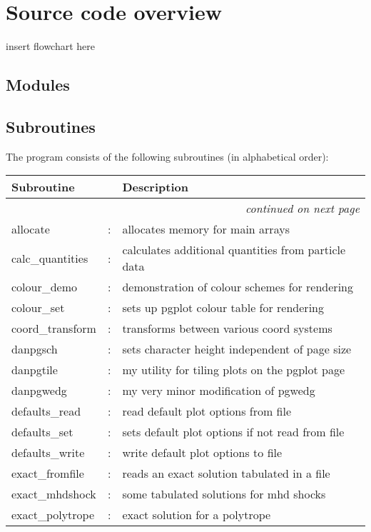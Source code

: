 \documentclass[a4paper,12pt]{article}
\begin{document}
\newpage
\appendix


\section{Source code overview}
 insert flowchart here

\subsection{Modules}

\subsection{Subroutines}
The program consists of the following subroutines (in alphabetical order):
\begin{longtable}{|lcp{}|}
\hline
Subroutine &  & Description \\
\hline \endhead
\multicolumn{3}{|r|}{\emph{continued on next page}} \\
\hline \endfoot
\hline \endlastfoot
allocate           & : & allocates memory for main arrays \\
calc\_quantities    & : & calculates additional quantities from particle data\\
colour\_demo        & : & demonstration of colour schemes for rendering\\
colour\_set	 & : & sets up pgplot colour table for rendering\\
coord\_transform    & : & transforms between various coord systems\\
danpgsch           & : & sets character height independent of page size\\
danpgtile          & : & my utility for tiling plots on the pgplot page\\
danpgwedg          & : & my very minor modification of pgwedg\\
defaults\_read	 & : & read default plot options from file\\
defaults\_set	 & : & sets default plot options if not read from file\\
defaults\_write	 & : & write default plot options to file\\
exact\_fromfile     & : & reads an exact solution tabulated in a file\\
exact\_mhdshock     & : & some tabulated solutions for mhd shocks \\
exact\_polytrope    & : & exact solution for a polytrope\\

\end{longtable}
\end{document}
